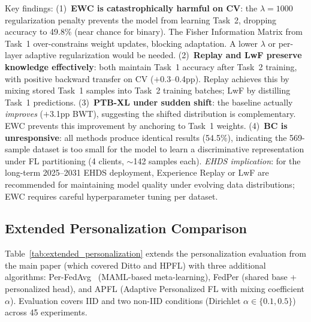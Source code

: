 \documentclass[conference]{IEEEtran}
\begin{document}
\begin{table}[htbp]
\vspace{1mm}
\footnotesize{Key findings: (1)~\textbf{EWC is catastrophically harmful on CV}: the $\lambda{=}1000$ regularization penalty prevents the model from learning Task~2, dropping accuracy to 49.8\% (near chance for binary). The Fisher Information Matrix from Task~1 over-constrains weight updates, blocking adaptation. A lower $\lambda$ or per-layer adaptive regularization would be needed. (2)~\textbf{Replay and LwF preserve knowledge effectively}: both maintain Task~1 accuracy after Task~2 training, with positive backward transfer on CV ($+$0.3--0.4pp). Replay achieves this by mixing stored Task~1 samples into Task~2 training batches; LwF by distilling Task~1 predictions. (3)~\textbf{PTB-XL under sudden shift}: the baseline actually \textit{improves} ($+$3.1pp BWT), suggesting the shifted distribution is complementary. EWC prevents this improvement by anchoring to Task~1 weights. (4)~\textbf{BC is unresponsive}: all methods produce identical results (54.5\%), indicating the 569-sample dataset is too small for the model to learn a discriminative representation under FL partitioning (4 clients, $\sim$142 samples each). \textit{EHDS implication}: for the long-term 2025--2031 EHDS deployment, Experience Replay or LwF are recommended for maintaining model quality under evolving data distributions; EWC requires careful hyperparameter tuning per dataset.}
\end{table}

\subsection{Extended Personalization Comparison}
\label{sec:extended_pers_exp}

Table~\ref{tab:extended_personalization} extends the personalization evaluation from the main paper (which covered Ditto and HPFL) with three additional algorithms: Per-FedAvg~\cite{fallah2020personalized} (MAML-based meta-learning), FedPer (shared base + personalized head), and APFL (Adaptive Personalized FL with mixing coefficient $\alpha$). Evaluation covers IID and two non-IID conditions (Dirichlet $\alpha \in \{0.1, 0.5\}$) across 45 experiments.
\end{document}
